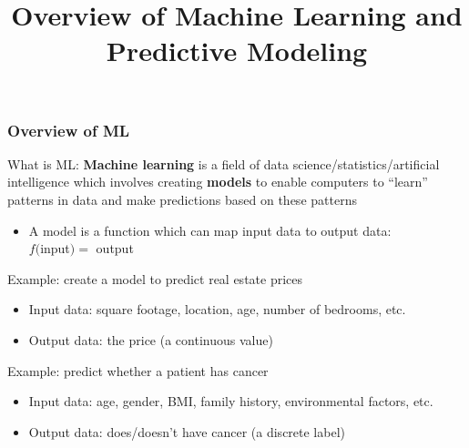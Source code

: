 \documentclass{beamer}
\title{Overview of Machine Learning and Predictive Modeling}
\date{}
\begin{document}
\frame{\titlepage}


\begin{frame}
	\frametitle{Overview of ML}
	
	\begin{alertblock}{What is ML:}
		\footnotesize
		\textbf{Machine learning} is a field of data science/statistics/artificial intelligence which involves creating \textbf{models} to enable computers to ``learn'' patterns in data and make predictions based on these patterns
		\begin{itemize}
			\item A model is a function which can map input data to output data: \\
			$f($input$) = $ output
		\end{itemize}
		
		\vspace{10pt}
		Example: create a model to predict real estate prices
		\begin{itemize}
			\item Input data: square footage, location, age, number of bedrooms, etc.
			\item Output data: the price (a continuous value)
		\end{itemize}
		
		\vspace{10pt}
		Example: predict whether a patient has cancer
		\begin{itemize}
			\item Input data: age, gender, BMI, family history, environmental factors, etc.
			\item Output data: does/doesn't have cancer (a discrete label)
		\end{itemize}
	\end{alertblock}
\end{frame}
\end{document}
